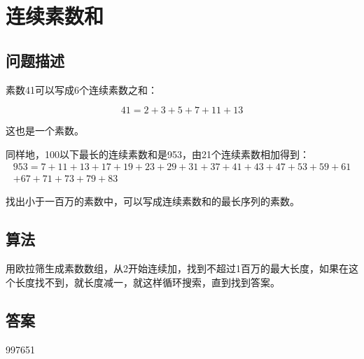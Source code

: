 \section{连续素数和}\label{sec:problem50}
\subsection{问题描述}
\begin{tcolorbox}
	素数41可以写成6个连续素数之和：

	\[
		41 = 2 + 3 + 5 + 7 + 11 + 13
	\]

	这也是一个素数。

	同样地，100以下最长的连续素数和是953，由21个连续素数相加得到：
	\begin{multline*}
		953 = 7 + 11 + 13 + 17 + 19 + 23 + 29 + 31 + 37 + 41 + 43 + 47 + 53 + 59 + 61\\ + 67 + 71 + 73 + 79 + 83
	\end{multline*}

	找出小于一百万的素数中，可以写成连续素数和的最长序列的素数。

\end{tcolorbox}

\subsection{算法}
用欧拉筛生成素数数组，从2开始连续加，找到不超过1百万的最大长度，如果在这个长度找不到，就长度减一，就这样循环搜索，直到找到答案。

\subsection{答案}
997651
